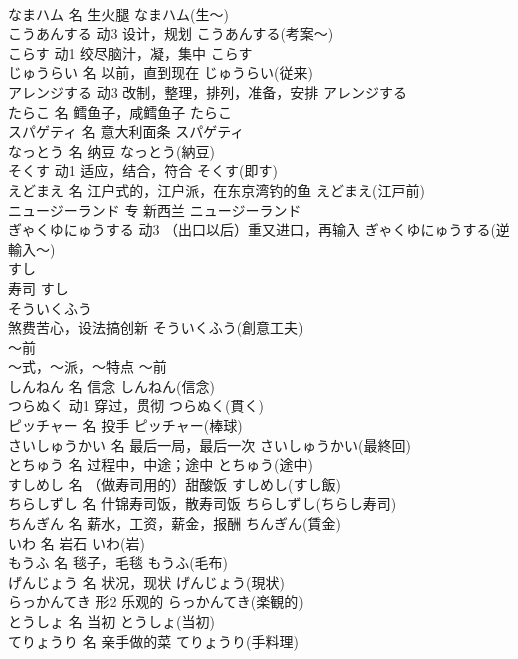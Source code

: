 \documentclass[8pt]{extreport}
\begin{document}
\begin{CJK}{UTF8}{min}
\\	なまハム	名	生火腿	なまハム(生～)	
\\	こうあんする	动3	设计，规划	こうあんする(考案～)	
\\	こらす	动1	绞尽脑汁，凝，集中	こらす	
\\	じゅうらい	名	以前，直到现在	じゅうらい(従来)	
\\	アレンジする	动3	改制，整理，排列，准备，安排	アレンジする	
\\	たらこ	名	鳕鱼子，咸鳕鱼子	たらこ	
\\	スパゲティ	名	意大利面条	スパゲティ	
\\	なっとう	名	纳豆	なっとう(納豆)	
\\	そくす	动1	适应，结合，符合	そくす(即す)	
\\	えどまえ	名	江户式的，江户派，在东京湾钓的鱼	えどまえ(江戸前)	
\\	ニュージーランド	专	新西兰	ニュージーランド	
\\	ぎゃくゆにゅうする	动3	（出口以后）重又进口，再输入	ぎゃくゆにゅうする(逆輸入～)	
\\	すし	
\\	寿司	すし
\\	そういくふう	
\\	煞费苦心，设法搞创新	そういくふう(創意工夫)	
\\	～前	
\\	～式，～派，～特点	～前	
\\	しんねん	名	信念	しんねん(信念)	
\\	つらぬく	动1	穿过，贯彻	つらぬく(貫く)	
\\	ピッチャー	名	投手	ピッチャー(棒球)	
\\	さいしゅうかい	名	最后一局，最后一次	さいしゅうかい(最終回)	
\\	とちゅう	名	过程中，中途；途中	とちゅう(途中)	
\\	すしめし	名	（做寿司用的）甜酸饭	すしめし(すし飯)	
\\	ちらしずし	名	什锦寿司饭，散寿司饭	ちらしずし(ちらし寿司)	
\\	ちんぎん	名	薪水，工资，薪金，报酬	ちんぎん(賃金)	
\\	いわ	名	岩石	いわ(岩)	
\\	もうふ	名	毯子，毛毯	もうふ(毛布)	
\\	げんじょう	名	状况，现状	げんじょう(現状)	
\\	らっかんてき	形2	乐观的	らっかんてき(楽観的)	
\\	とうしょ	名	当初	とうしょ(当初)	
\\	てりょうり	名	亲手做的菜	てりょうり(手料理)	

\end{CJK}
\end{document}
